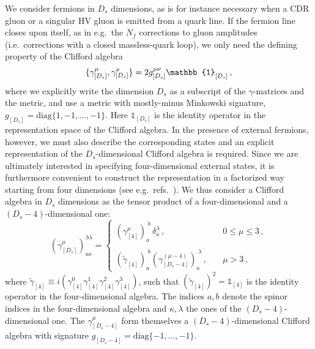 We consider fermions in $D_s$ dimensions, as is for instance
necessary when a CDR gluon or a singular HV gluon is emitted 
from a quark line. If the fermion line closes upon itself, as in
e.g.\ the $N_f$ corrections to gluon amplitudes
(i.e.\  corrections with a closed massless-quark loop), 
we only need the defining
property of the Clifford algebra
\begin{equation} \label{eqn:defClifford}
\{ \gamma_{[D_s]}^\mu, \gamma_{[D_s]}^\nu \} = 
2 g_{[D_s]}^{\mu\nu}\mathbb{1}_{[D_s]}^{\vphantom{\mu\nu}} \,,
\end{equation}
where we explicitly write the dimension $D_s$
as a subscript of the $\gamma$-matrices and the metric, and
use a metric with mostly-minus Minkowski signature, 
$g_{[D_s]}=\mathrm{diag}\{1, -1 , ... , -1 \}$.
Here $\mathbb{1}_{[D_s]}$ is the identity operator in the representation space of 
the Clifford algebra.
In the presence of external fermions, however, 
we must also describe the corresponding states and
an explicit
representation of the $D_s$-dimensional Clifford algebra is
required. Since we are ultimately interested in specifying
four-dimensional
external states, it is furthermore convenient to construct 
the representation in a factorized way starting from four dimensions
(see e.g.\ refs.~\cite{Kreuzer:susylectures,Collins:1984xc}).
We thus consider a Clifford algebra
in $D_s$ dimensions as the tensor product of a
four-dimensional and a $(D_s-4)$-dimensional one:
\begin{equation}\label{eqn:cliffordrecursion}
%
(\gamma_{[D_s]}^\mu)_{a\kappa}^{\,b\lambda}  = \left\{ 
\begin{array}{ll} 
		\left(\gamma_{[4]}^\mu\right)_a^{\;b} \,
		\delta_\kappa^\lambda\,, &\quad  0\le\mu \le 3 \,,\\&\\
		\left(\tilde\gamma_{[4]}\right)_a^{\;b} 
		\left(\gamma_{[D_s-4]}^{(\mu-4)}\right)_\kappa^{\;\lambda}\,, 
        &\quad \mu > 3 \,,
\end{array}
		\right.
%
\end{equation}
where $\tilde\gamma_{[4]}\equiv i(\gamma_{[4]}^0
\gamma_{[4]}^1 \gamma_{[4]}^2 \gamma_{[4]}^3)$, such that 
$(\tilde\gamma_{[4]})^2 =\mathbb{1}_{[4]}$ is the identity
operator
in the four-dimensional algebra.
The indices $a,b$ denote the spinor indices in the
four-dimensional algebra and $\kappa,\lambda$ the ones of the 
$(D_s-4)$-dimensional one.
The $\gamma^\mu_{[D_s-4]}$ form themselves a 
$(D_s-4)$-dimensional Clifford algebra with signature
$g_{[D_s-4]}=\mathrm{diag}\{ -1 , ... , -1 \}$.

